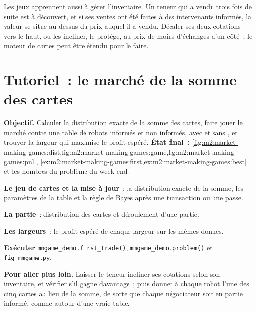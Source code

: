 Les jeux apprennent aussi à gérer l'inventaire. Un teneur qui a vendu trois fois de suite est à découvert, et
si ses ventes ont été faites à des intervenants informés, la valeur se situe au-dessus du prix auquel il a vendu. Décaler ses deux cotations
vers le haut, ou les incliner, le protège, au prix de moins d'échanges d'un côté~; le moteur
de cartes peut être étendu pour le faire.

\section{Tutoriel~: le marché de la somme des cartes}\label{tut:m2:market-making-games:mm}

\begin{tutorial}
\textbf{Objectif.} Calculer la distribution exacte de la somme des cartes, faire jouer le marché contre une table
de robots informés et non informés, avec et sans , et trouver la
largeur qui maximise le profit espéré.
\textbf{État final~:} \cref{fig:m2:market-making-games:dist,fig:m2:market-making-games:game,fig:m2:market-making-games:pnl},
\cref{ex:m2:market-making-games:first,ex:m2:market-making-games:best} et les nombres du
problème du week-end.
\begin{tutsteps}
\item \textbf{Le jeu de cartes et la mise à jour}~: la distribution exacte de la somme, les paramètres de la table et la règle de Bayes
après une transaction ou une passe.
\label{lst:m2:market-making-games:update}
\item \textbf{La partie}~: distribution des cartes et déroulement d'une partie.
\label{lst:m2:market-making-games:play}
\item \textbf{Les largeurs}~: le profit espéré de chaque largeur sur les mêmes donnes.
\label{lst:m2:market-making-games:pnl}
\item \textbf{Exécuter} \texttt{mmgame\_demo.first\_trade()}, \texttt{mmgame\_demo.problem()}
et \texttt{fig\_mmgame.py}.
\end{tutsteps}
\textbf{Pour aller plus loin.} Laisser le teneur incliner ses cotations selon son inventaire, et vérifier
s'il gagne davantage~; puis donner à chaque robot l'une des cinq cartes au lieu de la somme, de sorte que
chaque négociateur soit en partie informé, comme autour d'une vraie table.
\end{tutorial}

